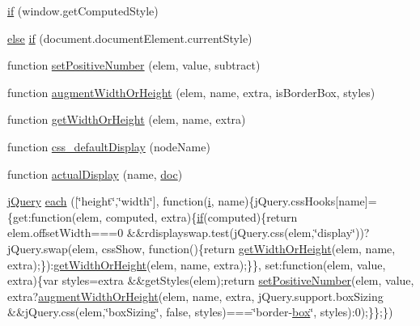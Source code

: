 \begin{DoxyCompactItemize}
\item 
\hyperlink{obj_2_release_2_package_2_package_tmp_2_scripts_2jquery-1_810_82_8js_add3620f254b483a46b557fde577ecbf7}{if} (window.\+get\+Computed\+Style)
\item 
\hyperlink{_scripts_2jquery_8validate_8js_a0544c3fe466e421738dae463968b70ba}{else} \hyperlink{obj_2_release_2_package_2_package_tmp_2_scripts_2jquery-1_810_82_8js_ac118b48e1947a1d7c85fefbdad49502e}{if} (document.\+document\+Element.\+current\+Style)
\item 
function \hyperlink{obj_2_release_2_package_2_package_tmp_2_scripts_2jquery-1_810_82_8js_a049182834e8b4b2d7485cd919ed272d7}{set\+Positive\+Number} (elem, value, subtract)
\item 
function \hyperlink{obj_2_release_2_package_2_package_tmp_2_scripts_2jquery-1_810_82_8js_aacaac1f0b5ea53030522e6f5b227ce51}{augment\+Width\+Or\+Height} (elem, name, extra, is\+Border\+Box, styles)
\item 
function \hyperlink{obj_2_release_2_package_2_package_tmp_2_scripts_2jquery-1_810_82_8js_a6520fbbeac78eeb0f519393470dc873b}{get\+Width\+Or\+Height} (elem, name, extra)
\item 
function \hyperlink{obj_2_release_2_package_2_package_tmp_2_scripts_2jquery-1_810_82_8js_a90f91be23732240774f2a323d500c78a}{css\+\_\+default\+Display} (node\+Name)
\item 
function \hyperlink{obj_2_release_2_package_2_package_tmp_2_scripts_2jquery-1_810_82_8js_a88bc5a80e40ccc594ece17ae5772d5d3}{actual\+Display} (name, \hyperlink{_scripts_2respond_8js_a8375eceb3a4b59a36700e7fc468e8983}{doc})
\item 
\hyperlink{_scripts_2jquery-1_810_82_8js_a5e01048fbd3a30b44e8d491d8945c457}{j\+Query} \hyperlink{obj_2_release_2_package_2_package_tmp_2_scripts_2jquery-1_810_82_8js_a7b098aabef28793353f2babd804e0b79}{each} (\mbox{[}\char`\"{}height\char`\"{},\char`\"{}width\char`\"{}\mbox{]}, function(\hyperlink{jquery_8unobtrusive-ajax_8min_8js_a84da5ff1aa6008a770fb28040f6b0569}{i}, name)\{j\+Query.\+css\+Hooks\mbox{[}name\mbox{]}=\{get\+:function(elem, computed, extra)\{\hyperlink{_scripts_2respond_8min_8js_a93851d60dd037a83509a1757b9ee7b66}{if}(computed)\{return elem.\+offset\+Width===0 \&\&rdisplayswap.\+test(j\+Query.\+css(elem,\char`\"{}display\char`\"{}))?j\+Query.\+swap(elem, css\+Show, function()\{return \hyperlink{_scripts_2jquery-1_810_82_8js_a6520fbbeac78eeb0f519393470dc873b}{get\+Width\+Or\+Height}(elem, name, extra);\})\+:\hyperlink{_scripts_2jquery-1_810_82_8js_a6520fbbeac78eeb0f519393470dc873b}{get\+Width\+Or\+Height}(elem, name, extra);\}\}, set\+:function(elem, value, extra)\{var styles=extra \&\&get\+Styles(elem);return \hyperlink{_scripts_2jquery-1_810_82_8js_a049182834e8b4b2d7485cd919ed272d7}{set\+Positive\+Number}(elem, value, extra?\hyperlink{_scripts_2jquery-1_810_82_8js_aacaac1f0b5ea53030522e6f5b227ce51}{augment\+Width\+Or\+Height}(elem, name, extra, j\+Query.\+support.\+box\+Sizing \&\&j\+Query.\+css(elem,\char`\"{}box\+Sizing\char`\"{}, false, styles)===\char`\"{}border-\/\hyperlink{login_8js_aa8f7ceeeb7d6500a03397f4cf05d3969}{box}\char`\"{}, styles)\+:0);\}\};\})

\end{DoxyCompactItemize}
